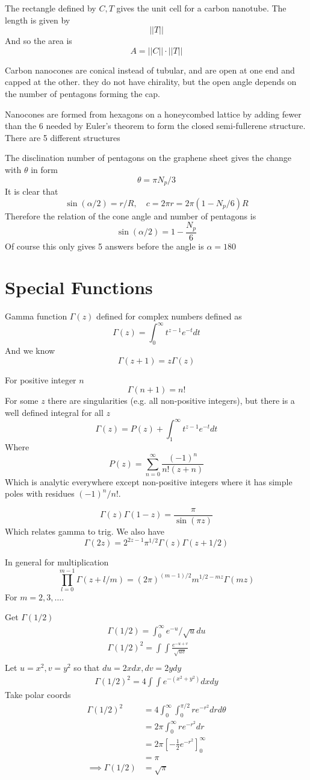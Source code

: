 \documentclass{X:/Documents/Coding/Latex/myassignment}
\begin{document}
The rectangle defined by $C,T$ gives the unit cell for a carbon nanotube. The length is given by
\[||T||\]
And so the area is
\[A = ||C||\cdot ||T||\]


Carbon nanocones are conical instead of tubular, and are open at one end and capped at the other. they do not have chirality, but the open angle depends on the number of pentagons forming the cap.

Nanocones are formed from hexagons on a honeycombed lattice by adding fewer than the $6$ needed by Euler's theorem to form the closed semi-fullerene structure. 
There are 5 different structures

The disclination number of pentagons on the graphene sheet gives the change with $\theta$ in form
\[\theta = \pi N_p/3\]
It is clear that 
\[\sin(\alpha /2 ) = r/R, \quad c = 2\pi r = 2\pi(1 - N_p/6)R\]
Therefore the relation of the cone angle and number of pentagons is
\[\sin(\alpha/2) = 1 - \frac{N_p}{6}\]
Of course this only gives 5 answers before the angle is $\alpha = 180$


\section{Special Functions}
Gamma function $\Gamma(z)$ defined for complex numbers defined as
\[\Gamma(z) = \int_0^\infty t^{z-1} e^{-t} dt\]
And we know
\[\Gamma(z+1) = z\Gamma(z)\]

For positive integer $n$
\[\Gamma(n+1) = n!\]
For some $z$ there are singularities (e.g. all non-positive integers), but there is a well defined integral for all $z$
\[\Gamma(z) = P(z) + \int_1^\infty t^{z-1}e^{-t}dt\]
Where
\[P(z) = \sum_{n=0}^\infty \frac{(-1)^n}{n!(z+n)}\]
Which is analytic everywhere except non-positive integers where it has simple poles with residues $(-1)^n/n!$.

\[\Gamma(z) \Gamma(1-z) = \frac{\pi}{\sin(\pi z)}\]
Which relates gamma to trig.
We also have
\[\Gamma(2z) = 2^{2z-1} \pi^{1/2} \Gamma(z) \Gamma(z+1/2)\]

In general for multiplication
\[\prod_{l=0}^{m-1} \Gamma(z+l/m) = (2\pi)^{(m-1)/2} m^{1/2-mz} \Gamma(mz)\]
For $m=2,3,\ldots$. 

Get $\Gamma(1/2)$
\begin{align*}
	\Gamma(1/2) = \int_{0}^{\infty} e^{-u}/\sqrt{u} du\\
	\Gamma(1/2)^2 = \int\int \frac{e^{-u+v}}{\sqrt{uv}}\\
\end{align*}
Let $u=x^2, v=y^2$ so that $du = 2xdx, dv = 2ydy$
\begin{align*}
	\Gamma(1/2)^2 = 4\int\int e^{-(x^2+y^2)} dxdy
\end{align*}
Take polar coords
\begin{align*}
	\Gamma(1/2)^2 &= 4 \int_0^\infty \int_0^{\pi/2} re^{-r^2} dr d\theta\\
	&= 2\pi \int_0^\infty re^{-r^2} dr\\
	&= 2\pi\left[-\frac12 e^{-r^2}\right]_0^\infty\\
	&= \pi \\
	\implies \Gamma(1/2) &= \sqrt{\pi}
\end{align*}
\end{document}
